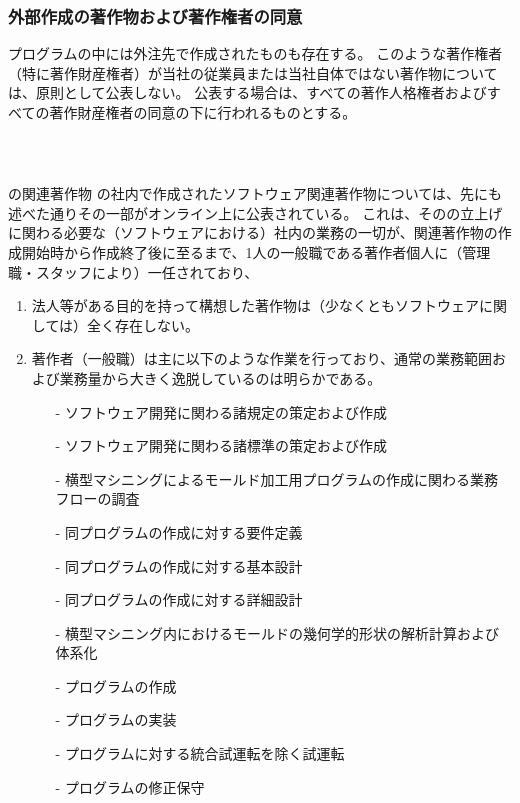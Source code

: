 \subsubsection{外部作成の著作物および著作権者の同意\label{subsec:copyrightsSubcontractor}}
プログラムの中には外注先で作成されたものも存在する。
このような著作権者（特に著作財産権者）が当社の従業員または当社自体ではない著作物については、原則として公表しない。
公表する場合は、すべての著作人格権者およびすべての著作財産権者の同意の下に行われるものとする。



\clearpage
~\vfill
\begin{Column}{\DMname の関連著作物}
\DMname の社内で作成されたソフトウェア関連著作物については、先にも述べた通りその一部がオンライン上に公表されている。
これは、その\DMname の立上げに関わる必要な（ソフトウェアにおける）社内の業務の一切が、関連著作物の作成開始時から作成終了後に至るまで、1人の一般職である著作者個人に（管理職・スタッフにより）一任されており、
\begin{enumerate}[label=\Roman*]
\item 法人等がある目的を持って構想した著作物は（少なくともソフトウェアに関しては）全く存在しない。
\item
著作者（一般職）は主に以下のような作業を行っており、通常の業務範囲および業務量から大きく逸脱しているのは明らかである。
  \begin{enumerate}
  \item[-] ソフトウェア開発に関わる諸規定の策定および作成
  \item[-] ソフトウェア開発に関わる諸標準の策定および作成
  \item[-] 横型マシニングによるモールド加工用プログラムの作成に関わる業務フローの調査
  \item[-] 同プログラムの作成に対する要件定義
  \item[-] 同プログラムの作成に対する基本設計
  \item[-] 同プログラムの作成に対する詳細設計
  \item[-] 横型マシニング内におけるモールドの幾何学的形状の解析計算および体系化
  \item[-] プログラムの作成
  \item[-] プログラムの実装
  \item[-] プログラムに対する統合試運転を除く試運転
  \item[-] プログラムの修正保守

\end{enumerate}
\end{enumerate}
\end{Column}
